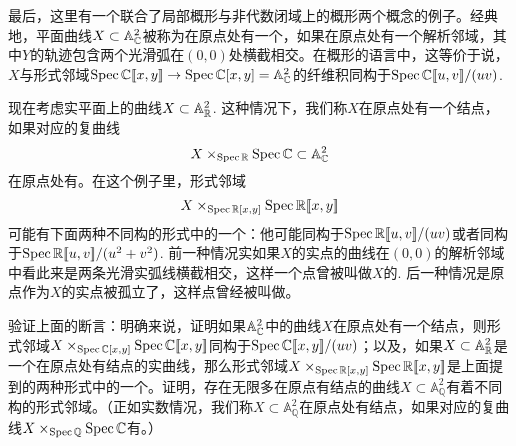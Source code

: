 最后，这里有一个联合了局部概形与非代数闭域上的概形两个概念的例子。经典地，平面曲线$X\subset \mathbb{A}_{\mathbb{C}}^2$被称为在原点处有一个，如果在原点处有一个解析邻域，其中$Y$的轨迹包含两个光滑弧在$(0,0)$处横截相交。在概形的语言中，这等价于说，$X$与形式邻域$\operatorname{Spec} \mathbb{C}[\![x,y]\!]\to \operatorname{Spec} \mathbb{C}[x,y]=\mathbb{A}_{\mathbb{C}}^2$的纤维积同构于$\operatorname{Spec} \mathbb{C}[\![u,v]\!]/(uv)$.

现在考虑实平面上的曲线$X\subset \mathbb{A}_{\mathbb{R}}^2$. 这种情况下，我们称$X$在原点处有一个结点，如果对应的复曲线
\[
	X\times_{\operatorname{Spec} \mathbb{R}}\operatorname{Spec} \mathbb{C} \subset \mathbb{A}_{\mathbb{C}}^2
\]
在原点处有。在这个例子里，形式邻域
\[
	X\times_{\operatorname{Spec} \mathbb{R}[x,y]}\operatorname{Spec} \mathbb{R}[\![x,y]\!]
\]
可能有下面两种不同构的形式中的一个：他可能同构于$\operatorname{Spec} \mathbb{R}[\![u,v]\!]/(uv)$或者同构于$\operatorname{Spec} \mathbb{R}[\![u,v]\!]/(u^2+v^2)$. 前一种情况实如果$X$的实点的曲线在$(0,0)$的解析邻域中看此来是两条光滑实弧线横截相交，这样一个点曾被叫做$X$的. 后一种情况是原点作为$X$的实点被孤立了，这样点曾经被叫做。

\begin{exe}
	验证上面的断言：明确来说，证明如果$\mathbb{A}_{\mathbb{C}}^2$中的曲线$X$在原点处有一个结点，则形式邻域$X\times_{\operatorname{Spec} \mathbb{C}[x,y]}\operatorname{Spec} \mathbb{C}[\![x,y]\!]$同构于$\operatorname{Spec}\mathbb{C}[\![x,y]\!]/(uv)$；以及，如果$X\subset \mathbb{A}_{\mathbb{R}}^2$是一个在原点处有结点的实曲线，那么形式邻域$X\times_{\operatorname{Spec} \mathbb{R}[x,y]}\operatorname{Spec} \mathbb{R}[\![x,y]\!]$是上面提到的两种形式中的一个。证明，存在无限多在原点有结点的曲线$X\subset \mathbb{A}_{\mathbb{Q}}^2$有着不同构的形式邻域。（正如实数情况，我们称$X\subset \mathbb{A}^2_\mathbb{Q}$在原点处有结点，如果对应的复曲线$X\times_{\operatorname{Spec} \mathbb{Q}} \operatorname{Spec} \mathbb{C}$有。）
\end{exe}
